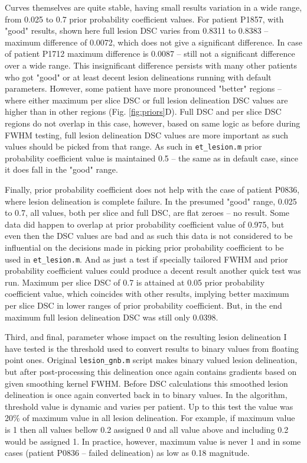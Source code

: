 \documentclass[12pt]{article}
\begin{document}
Curves themselves are quite stable, having small results variation in a wide range, from 0.025 to 0.7 prior probability coefficient values. For patient P1857, with "good" results, shown here full lesion DSC varies from 0.8311 to 0.8383 – maximum difference of 0.0072, which does not give a significant difference. In case of patient P1712 maximum difference is 0.0087 – still not a significant difference over a wide range. This insignificant difference persists with many other patients who got "good" or at least decent lesion delineations running with default parameters. However, some patient have more pronounced "better" regions – where either maximum per slice DSC  or full lesion delineation DSC values are higher than in other regions (Fig. \ref{fig:priors}D). Full DSC and per slice DSC regions do not overlap in this case, however, based on same logic as before during FWHM testing, full lesion delineation DSC values are more important as such values should be picked from that range. As such in \texttt{et\_lesion.m} prior probability coefficient value is maintained 0.5 – the same as in default case, since it does fall in the "good" range.

Finally, prior probability coefficient does not help with the case of patient P0836, where lesion delineation is complete failure. In the presumed "good" range, 0.025 to 0.7, all values, both per slice and full DSC, are flat zeroes – no result. Some data did happen to overlap at prior probability coefficient value of 0.975, but even then the DSC values are bad and as such this data is not considered to be influential on the decisions made in picking prior probability coefficient to be used in \texttt{et\_lesion.m}. And as just a test if specially tailored FWHM and prior probability coefficient values could produce a decent result another quick test was run. Maximum per slice DSC of 0.7 is attained at 0.05 prior probability coefficient value, which coincides with other results, implying better maximum per slice DSC in lower ranges of prior probability coefficient. But, in the end maximum full lesion delineation DSC was still only 0.0398.

Third, and final, parameter whose impact on the resulting lesion delineation I have tested is the threshold used to convert results to binary values from floating point ones. Original \texttt{lesion\_gnb.m} script makes binary valued lesion delineation, but after post-processing this delineation once again contains gradients based on given smoothing kernel FWHM. Before DSC calculations this smoothed lesion delineation is once again converted back in to binary values. In the algorithm, threshold value is dynamic and varies per patient. Up to this test the value was 20\% of maximum value in all lesion delineation. For example, if maximum value is 1 then all values bellow 0.2 assigned 0 and all value above and including 0.2 would be assigned 1. In practice, however, maximum value is never 1 and in some cases (patient P0836 – failed delineation) as low as 0.18 magnitude. 
\end{document}
